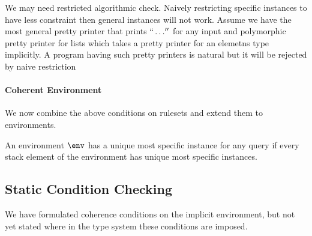 We may need restricted algorithmic check. Naively restricting specific instances to
have less constraint then general instances will not work. Assume we have the most
general pretty printer that prints $``\dots''$ for any input and polymorphic pretty
printer for lists which takes a pretty printer for an elemetns type implicitly.
A program having such pretty printers is natural but it will be rejected by naive
restriction 



\paragraph{Coherent Environment} We now combine the above conditions
on rulesets and extend them to environments.
\begin{theorem}
An environment $\env$ has a unique most specific instance for any query if
every stack element of the environment has unique most specific instances.
\end{theorem}

\subsection{Static Condition Checking}

We have formulated coherence conditions on the implicit environment, but not
yet stated where in the type system these conditions are imposed.

